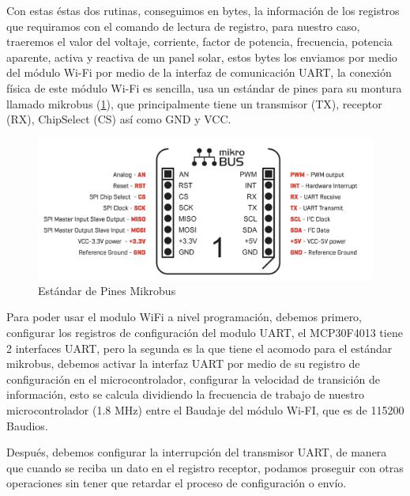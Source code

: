 Con estas éstas dos rutinas, conseguimos en bytes, la información de los registros que requiramos con el comando de lectura de registro, para nuestro caso, traeremos el valor del voltaje, corriente, factor de potencia, frecuencia, potencia aparente, activa y reactiva de un panel solar, estos bytes los enviamos por medio del módulo Wi-Fi por medio de la interfaz de comunicación UART, la conexión física de este módulo Wi-Fi es sencilla, usa un estándar de pines para su montura llamado mikrobus (\ref{fig:Mikrobus}), que principalmente tiene un transmisor (TX), receptor (RX), ChipSelect (CS) así como GND y VCC. 

\begin{figure}[H]
	\centering
	\includegraphics[scale=.2]{Capitulo2/images/mikrobus.png}
	\caption{Estándar de Pines Mikrobus}
	\label{fig:Mikrobus}
\end{figure}

Para poder usar el modulo WiFi a nivel programación, debemos primero, configurar los registros de configuración del modulo UART, el MCP30F4013 tiene 2 interfaces UART, pero la segunda es la que tiene el acomodo para el estándar mikrobus, debemos activar la interfaz UART por medio de su registro de configuración en el microcontrolador, configurar la velocidad de transición de información, esto se calcula dividiendo la frecuencia de trabajo de nuestro microcontrolador (1.8 MHz) entre el Baudaje del módulo Wi-FI, que es de 115200 Baudios.

Después, debemos configurar la interrupción del transmisor UART, de manera que cuando se reciba un dato en el registro receptor, podamos proseguir con otras operaciones sin tener que retardar el proceso de configuración o envío.

